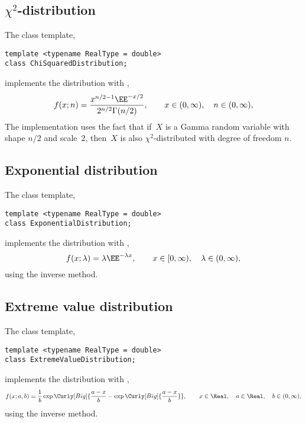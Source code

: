 \subsection{\texorpdfstring{$\chi^2$}{Chi-squared}-distribution}
\label{Chi-squared-distribution}

The class template,
\begin{verbatim}
template <typename RealType = double>
class ChiSquaredDistribution;
\end{verbatim}
implements the distribution with \pdf,
\begin{equation*}
  f(x;n) = \frac{x^{n/2 - 1}\EE^{-x/2}}{2^{n/2}\Gamma(n/2)},\qquad
  x \in (0,\infty),\quad n \in (0,\infty),
\end{equation*}
The implementation uses the fact that if~$X$ is a Gamma random variable with
shape $n / 2$ and scale~$2$, then~$X$ is also $\chi^2$-distributed with degree
of freedom $n$.

\subsection{Exponential distribution}
\label{sub:Exponential distribution}

The class template,
\begin{verbatim}
template <typename RealType = double>
class ExponentialDistribution;
\end{verbatim}
implements the distribution with \pdf,
\begin{equation*}
  f(x;\lambda) = \lambda\EE^{-\lambda x},\qquad
  x \in [0,\infty),\quad \lambda \in (0,\infty),
\end{equation*}
using the inverse method.

\subsection{Extreme value distribution}
\label{sub:Extreme value distribution}

The class template,
\begin{verbatim}
template <typename RealType = double>
class ExtremeValueDistribution;
\end{verbatim}
implements the distribution with \pdf,
\begin{equation*}
  f(x;a,b) =
  \frac{1}{b}\exp\Curly[Big]{
    \frac{a - x}{b} - \exp\Curly[Big]{\frac{a - x}{b}}},\qquad
  x \in \Real,\quad a \in \Real,\quad b \in (0, \infty),
\end{equation*}
using the inverse method.

